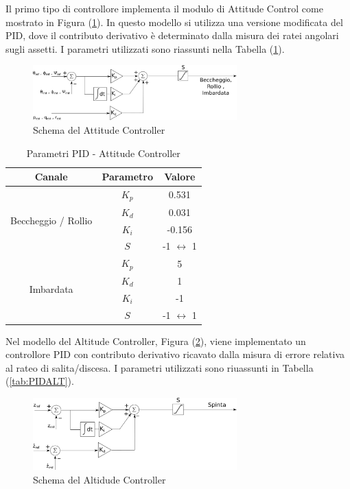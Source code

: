 Il primo tipo di controllore implementa il modulo di Attitude Control come mostrato in Figura (\ref{fig:PIDAttitudeCTR}). In questo modello si utilizza una versione modificata del PID, dove il contributo derivativo è determinato dalla misura dei ratei angolari sugli assetti. I parametri utilizzati sono riassunti nella Tabella (\ref{tab:PIDATT}).

\begin{figure}
	\centering
	\includegraphics[width=0.7\textwidth]{SistemaQuadrirotore/Figure/PIDAttitudeCtrl}
	\caption{Schema del Attitude Controller}
	\label{fig:PIDAttitudeCTR}
\end{figure}


\begin{table}
	\centering
	\caption{Parametri PID - Attitude Controller}
	\begin{tabular}{c c c}
		\hline
		Canale  & Parametro & Valore \\
		\hline
		\multirow{4}{*}{Beccheggio / Rollio}&$K_p$ & 0.531 \\
		&$K_d$ & 0.031\\
		&$K_i$ & -0.156\\
		&$S$ & -1 $\leftrightarrow$ 1\\
		\hline
		\multirow{4}{*}{Imbardata}&$K_p$ & 5 \\
		&$K_d$ & 1\\
		&$K_i$ & -1\\
		&$S$ & -1 $\leftrightarrow$ 1\\
		\hline
	\end{tabular}	
	\label{tab:PIDATT}
\end{table}

Nel modello del Altitude Controller, Figura (\ref{fig:PIDAltitudeCTR}), viene implementato un controllore PID con contributo derivativo ricavato dalla misura di errore relativa al rateo di salita/discesa. I parametri utilizzati sono riuassunti in Tabella (\ref{tab:PIDALT}).

\begin{figure}
	\centering
	\includegraphics[width=0.7\textwidth]{SistemaQuadrirotore/Figure/PIDAltitudeCtrl}
	\caption{Schema del Altidude Controller}
	\label{fig:PIDAltitudeCTR}
\end{figure}

